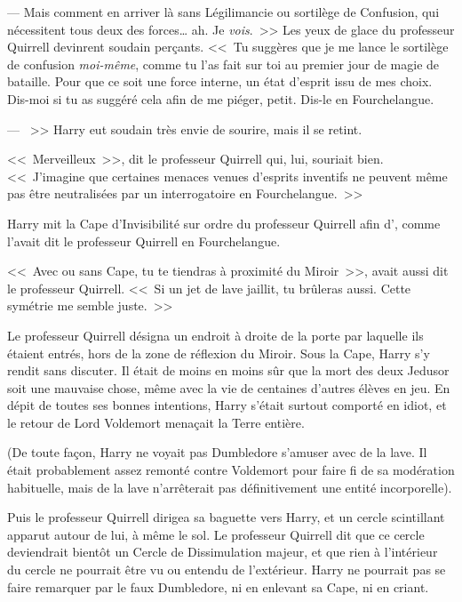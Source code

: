--- Mais comment en arriver là sans Légilimancie ou sortilège de Confusion, qui nécessitent tous deux des forces… ah. Je \emph{vois}.~>> Les yeux de glace du professeur Quirrell devinrent soudain perçants. <<~Tu suggères que je me lance le sortilège de confusion \emph{moi-même}, comme tu l'as fait sur toi au premier jour de magie de bataille. Pour que ce soit une force interne, un état d'esprit issu de mes choix. Dis-moi si tu as suggéré cela afin de me piéger, petit. Dis-le en Fourchelangue.

--- ~>> Harry eut soudain très envie de sourire, mais il se retint.

<<~Merveilleux~>>, dit le professeur Quirrell qui, lui, souriait bien. <<~J'imagine que certaines menaces venues d'esprits inventifs ne peuvent même pas être neutralisées par un interrogatoire en Fourchelangue.~>>

\later

Harry mit la Cape d'Invisibilité sur ordre du professeur Quirrell afin d', comme l'avait dit le professeur Quirrell en Fourchelangue.

<<~Avec ou sans Cape, tu te tiendras à proximité du Miroir~>>, avait aussi dit le professeur Quirrell. <<~Si un jet de lave jaillit, tu brûleras aussi. Cette symétrie me semble juste.~>>

Le professeur Quirrell désigna un endroit à droite de la porte par laquelle ils étaient entrés, hors de la zone de réflexion du Miroir. Sous la Cape, Harry s'y rendit sans discuter. Il était de moins en moins sûr que la mort des deux Jedusor soit une mauvaise chose, même avec la vie de centaines d'autres élèves en jeu. En dépit de toutes ses bonnes intentions, Harry s'était surtout comporté en idiot, et le retour de Lord Voldemort menaçait la Terre entière.

(De toute façon, Harry ne voyait pas Dumbledore s'amuser avec de la lave. Il était probablement assez remonté contre Voldemort pour faire fi de sa modération habituelle, mais de la lave n'arrêterait pas définitivement une entité incorporelle).

Puis le professeur Quirrell dirigea sa baguette vers Harry, et un cercle scintillant apparut autour de lui, à même le sol. Le professeur Quirrell dit que ce cercle deviendrait bientôt un Cercle de Dissimulation majeur, et que rien à l'intérieur du cercle ne pourrait être vu ou entendu de l'extérieur. Harry ne pourrait pas se faire remarquer par le faux Dumbledore, ni en enlevant sa Cape, ni en criant.

